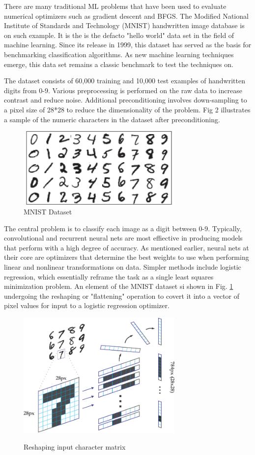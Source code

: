 \documentclass[10pt,twocolumn]{article}
\begin{document}
There are many traditional ML problems that have been used to evaluate numerical optimizers such as gradient descent and BFGS. The Modified National Institute of Standards and Technology (MNIST) handwritten image database is on such example. It is the is the defacto "hello world" data set in the field of machine learning. Since its release in 1999, this dataset has served as the basis for benchmarking classification algorithms. As new machine learning techniques emerge, this data set remains a classic benchmark to test the techniques on. 

The dataset consists of 60,000 training and 10,000 test examples of handwritten digits from 0-9. Various preprocessing is performed on the raw data to increase contrast and reduce noise. Additional  preconditioning involves down-sampling to a pixel size of 28*28 to reduce the dimensionality of the problem. Fig 2 illustrates a sample of the numeric characters in the dataset after preconditioning.

\begin{figure}
\includegraphics[width=3.2in]{./mnist.png}
\caption{MNIST Dataset}
\end{figure}



The central problem is to classify each image as a digit between 0-9. Typically, convolutional and recurrent neural nets are most effiective in producing models that perform with a high degree of accuracy. As mentioned earlier, neural nets at their core are optimizers that determine the best weights to use when performing  linear and nonlinear transformations on data. Simpler methods include logistic regression, which essentially reframe the task as a single least squares minimization problem. An element of the MNIST dataset si shown in Fig. \ref{mnist-reshape} undergoing the reshaping or "flattening" operation to covert it into a vector of pixel values for input to a logistic regression optimizer. 

\begin{figure}
\includegraphics[width=3.2in]{./mnist-reshape.png}
\label{mnist-reshape}
\caption{Reshaping input character matrix}
\end{figure}
\end{document}
